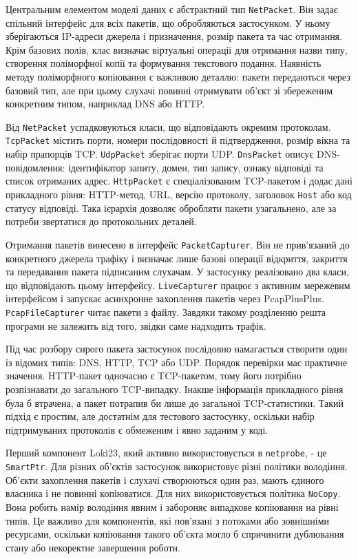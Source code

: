 Центральним елементом моделі даних є абстрактний тип \texttt{NetPacket}.
Він задає спільний інтерфейс для всіх пакетів, що обробляються
застосунком. У ньому зберігаються IP-адреси джерела і призначення,
розмір пакета та час отримання. Крім базових полів, клас визначає
віртуальні операції для отримання назви типу, створення поліморфної
копії та формування текстового подання. Наявність методу поліморфного
копіювання є важливою деталлю: пакети передаються через базовий тип, але
при цьому слухачі повинні отримувати об'єкт зі збереженим конкретним
типом, наприклад DNS або HTTP.

Від \texttt{NetPacket} успадковуються класи, що відповідають окремим
протоколам. \texttt{TcpPacket} містить порти, номери послідовності й
підтвердження, розмір вікна та набір прапорців TCP. \texttt{UdpPacket}
зберігає порти UDP. \texttt{DnsPacket} описує DNS-повідомлення:
ідентифікатор запиту, домен, тип запису, ознаку відповіді та список
отриманих адрес. \texttt{HttpPacket} є спеціалізованим TCP-пакетом і
додає дані прикладного рівня: HTTP-метод, URL, версію протоколу,
заголовок \texttt{Host} або код статусу відповіді. Така ієрархія
дозволяє обробляти пакети узагальнено, але за потреби звертатися до
протокольних деталей.

Отримання пакетів винесено в інтерфейс \texttt{PacketCapturer}. Він не
прив'язаний до конкретного джерела трафіку і визначає лише базові
операції відкриття, закриття та передавання пакета підписаним слухачам.
У застосунку реалізовано два класи, що відповідають цьому інтерфейсу.
\texttt{LiveCapturer} працює з активним мережевим інтерфейсом і запускає
асинхронне захоплення пакетів через PcapPlusPlus.
\texttt{PcapFileCapturer} читає пакети з файлу. Завдяки такому
розділенню решта програми не залежить від того, звідки саме надходить
трафік.

Під час розбору сирого пакета застосунок послідовно намагається створити
один із відомих типів: DNS, HTTP, TCP або UDP. Порядок перевірки має
практичне значення. HTTP-пакет одночасно є TCP-пакетом, тому його
потрібно розпізнавати до загального TCP-випадку. Інакше інформація
прикладного рівня була б втрачена, а пакет потрапив би лише до загальної
TCP-статистики. Такий підхід є простим, але достатнім для тестового
застосунку, оскільки набір підтримуваних протоколів є обмеженим і явно
заданим у коді.

Перший компонент Loki23, який активно використовується в
\texttt{netprobe}, - це \texttt{SmartPtr}. Для різних об'єктів
застосунок використовує різні політики володіння. Об'єкти захоплення
пакетів і слухачі створюються один раз, мають єдиного власника і не
повинні копіюватися. Для них використовується політика \texttt{NoCopy}.
Вона робить намір володіння явним і забороняє випадкове копіювання на
рівні типів. Це важливо для компонентів, які пов'язані з потоками або
зовнішніми ресурсами, оскільки копіювання такого об'єкта могло б
спричинити дублювання стану або некоректне завершення роботи.

